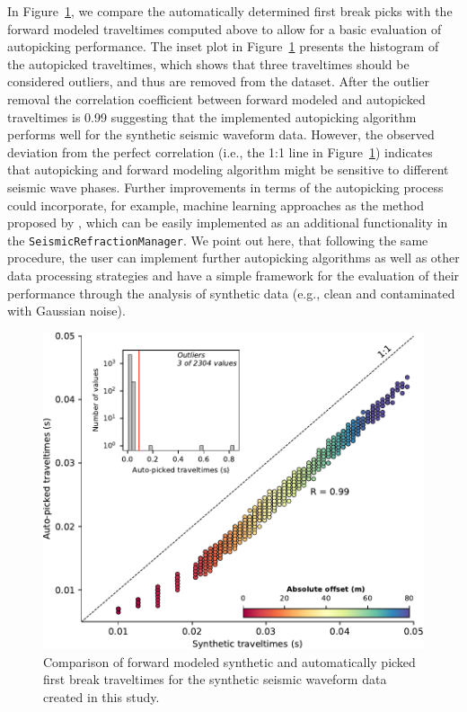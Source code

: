 \documentclass[a4paper,fleqn]{cas-sc}
\begin{document}
In Figure~\ref{fig:pickcomp}, we compare the automatically determined first break picks with the forward modeled traveltimes computed above to allow for a basic evaluation of autopicking performance. The inset plot in Figure~\ref{fig:pickcomp} presents the histogram of the autopicked traveltimes, which shows that three traveltimes should be considered outliers, and thus are removed from the dataset. After the outlier removal the correlation coefficient between forward modeled and autopicked traveltimes is \num{0.99} suggesting that the implemented autopicking algorithm performs well for the synthetic seismic waveform data. However, the observed deviation from the perfect correlation (i.e., the 1:1 line in Figure~\ref{fig:pickcomp}) indicates that autopicking and forward modeling algorithm might be sensitive to different seismic wave phases. Further improvements in terms of the autopicking process could incorporate, for example, machine learning approaches as the method proposed by \citet{duan2020}, which can be easily implemented as an additional functionality in the \texttt{SeismicRefractionManager}. We point out here, that following the same procedure, the user can implement further autopicking algorithms as well as other data processing strategies and have a simple framework for the evaluation of their performance through the analysis of synthetic data (e.g., clean and contaminated with Gaussian noise).
\begin{figure}
	\centering
	\includegraphics[width=.75\textwidth]{figures/pick_comparison.pdf}
	\caption{Comparison of forward modeled synthetic and automatically picked first break traveltimes for the synthetic seismic waveform data created in this study.}
	\label{fig:pickcomp}
\end{figure}
\end{document}
